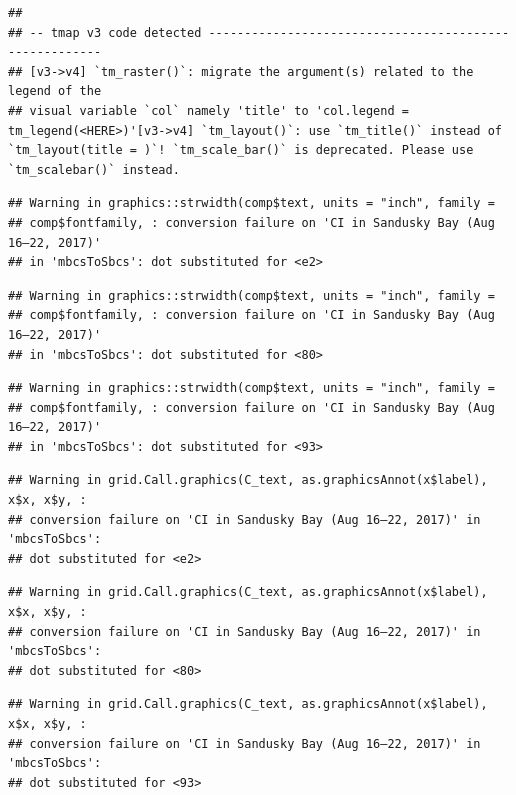 \documentclass[
]{article}
\begin{document}
\begin{verbatim}
## 
## -- tmap v3 code detected -------------------------------------------------------
## [v3->v4] `tm_raster()`: migrate the argument(s) related to the legend of the
## visual variable `col` namely 'title' to 'col.legend = tm_legend(<HERE>)'[v3->v4] `tm_layout()`: use `tm_title()` instead of `tm_layout(title = )`! `tm_scale_bar()` is deprecated. Please use `tm_scalebar()` instead.
\end{verbatim}

\begin{verbatim}
## Warning in graphics::strwidth(comp$text, units = "inch", family =
## comp$fontfamily, : conversion failure on 'CI in Sandusky Bay (Aug 16–22, 2017)'
## in 'mbcsToSbcs': dot substituted for <e2>
\end{verbatim}

\begin{verbatim}
## Warning in graphics::strwidth(comp$text, units = "inch", family =
## comp$fontfamily, : conversion failure on 'CI in Sandusky Bay (Aug 16–22, 2017)'
## in 'mbcsToSbcs': dot substituted for <80>
\end{verbatim}

\begin{verbatim}
## Warning in graphics::strwidth(comp$text, units = "inch", family =
## comp$fontfamily, : conversion failure on 'CI in Sandusky Bay (Aug 16–22, 2017)'
## in 'mbcsToSbcs': dot substituted for <93>
\end{verbatim}

\begin{verbatim}
## Warning in grid.Call.graphics(C_text, as.graphicsAnnot(x$label), x$x, x$y, :
## conversion failure on 'CI in Sandusky Bay (Aug 16–22, 2017)' in 'mbcsToSbcs':
## dot substituted for <e2>
\end{verbatim}

\begin{verbatim}
## Warning in grid.Call.graphics(C_text, as.graphicsAnnot(x$label), x$x, x$y, :
## conversion failure on 'CI in Sandusky Bay (Aug 16–22, 2017)' in 'mbcsToSbcs':
## dot substituted for <80>
\end{verbatim}

\begin{verbatim}
## Warning in grid.Call.graphics(C_text, as.graphicsAnnot(x$label), x$x, x$y, :
## conversion failure on 'CI in Sandusky Bay (Aug 16–22, 2017)' in 'mbcsToSbcs':
## dot substituted for <93>
\end{verbatim}
\end{document}
